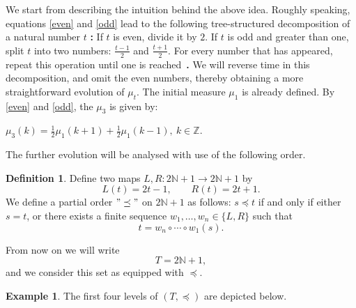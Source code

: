 \documentclass[10pt]{amsart}
\theoremstyle{definition}
\newtheorem{definition}[theorem]{Definition}
\newtheorem{example}[theorem]{Example}
\numberwithin{equation}{section}
\newcommand{\N}{\mathbb{N}}
\begin{document}
We start from describing the intuition behind the above idea. Roughly speaking, equations \eqref{even} and \eqref{odd} lead to the following tree-structured decomposition of a natural number $t$ \textbf{:}  If $t$ is even, divide it by $2$. If $t$ is odd and greater than one, split $t$ into two numbers: $\frac{t-1}{2}$ and $\frac{t+1}{2}$.  For every number that has appeared, repeat this operation  until one is reached\ \textbf{.}  We will reverse time in this decomposition, and omit the even numbers, thereby obtaining a more straightforward evolution of $\mu_t$.%
The initial measure $\mu_1$ is already defined.  By \eqref{even} and \eqref{odd}, the $\mu_3$ is given by: 
\begin{center}
$\mu_3(k)=\frac{1}{2}\mu_1(k+1)+\frac{1}{2}\mu_1(k-1),\ k\in\mathbb{Z}$.
\end{center} 
The further evolution will be analysed with use of  the following order.
\begin{definition}\label{order}
Define two maps $L, R \colon 2\N+1 \to 2\N+1$ by
\begin{equation}\label{eq:left-right}
L(t) = 2t - 1, \qquad R(t) = 2t + 1.
\end{equation}
We define a partial order $"\preceq"$ on $2\N+1$ as follows:
 $s \preceq t$ if and only if either $s=t$, or there exists a finite sequence $w_1, \ldots, w_n \in \{L, R\}$
such that
\begin{equation}\label{order-def}
t =w_n \circ \cdots \circ w_1(s).
\end{equation}
\end{definition}
 From now on we will write 
$$T=2\N+1,$$
and we consider this set as equipped with $\preceq$.

\begin{example}\label{ex:tree-levels}
The first four levels of $(T, \preceq)$ are
depicted below.
\begin{center}
\end{center}
\end{example}
\end{document}
